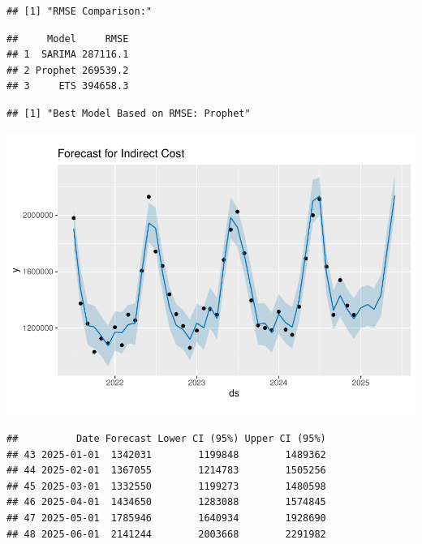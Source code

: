 \documentclass[
]{article}
\begin{document}
\begin{verbatim}
## [1] "RMSE Comparison:"
\end{verbatim}

\begin{verbatim}
##     Model     RMSE
## 1  SARIMA 287116.1
## 2 Prophet 269539.2
## 3     ETS 394658.3
\end{verbatim}

\begin{verbatim}
## [1] "Best Model Based on RMSE: Prophet"
\end{verbatim}

\includegraphics{Indirect-Cost-Forecasting_files/figure-latex/unnamed-chunk-4-1.pdf}

\begin{verbatim}
##          Date Forecast Lower CI (95%) Upper CI (95%)
## 43 2025-01-01  1342031        1199848        1489362
## 44 2025-02-01  1367055        1214783        1505256
## 45 2025-03-01  1332550        1199273        1480598
## 46 2025-04-01  1434650        1283088        1574845
## 47 2025-05-01  1785946        1640934        1928690
## 48 2025-06-01  2141244        2003668        2291982
\end{verbatim}
\end{document}
